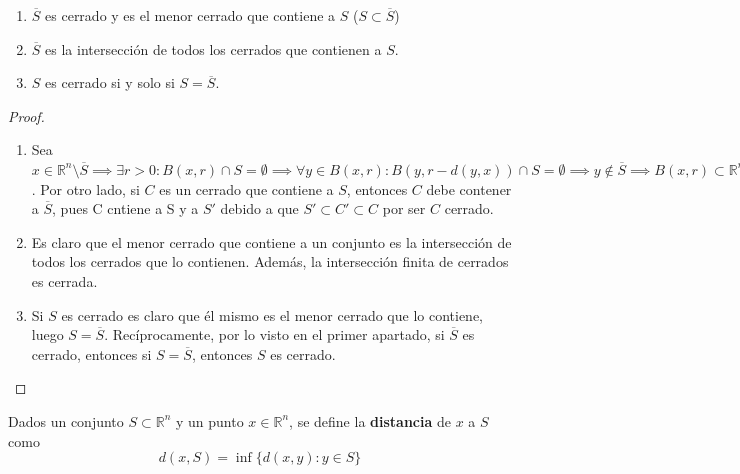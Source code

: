 \begin{proposición}
    \begin{enumerate}
        \item $\overline{S}$ es cerrado y es el menor cerrado que contiene a $S$ ($S \subset \overline{S}$)
        \item $\overline{S}$ es la intersección de todos los cerrados que contienen a $S$.
        \item $S$ es cerrado si y solo si $S = \overline{S}$.
    \end{enumerate}
\end{proposición}
\begin{proof}
    \begin{enumerate}
        \item Sea $x \in \mathbb{R}^n \setminus \overline{S} \implies \exists r > 0 : B(x, r) \cap S = \emptyset \implies \forall y \in B(x, r) : B(y, r - d(y,x)) \cap S = \emptyset \implies y \notin \overline{S} \implies B(x,r) \subset \mathbb{R}^n \setminus \overline{S}$. \newline
        Por otro lado, si $C$ es un cerrado que contiene a $S$, entonces $C$ debe contener a $\overline{S}$, pues C cntiene a S y a $S'$ debido a que $S' \subset C' \subset C$ por ser $C$ cerrado. 
        \item Es claro que el menor cerrado que contiene a un conjunto es la intersección de todos los cerrados que lo contienen. Además, la intersección finita de cerrados es cerrada. 
        \item Si $S$ es cerrado es claro que él mismo es el menor cerrado que lo contiene, luego $S = \overline{S}$. Recíprocamente, por lo visto en el primer apartado, si $\overline{S}$ es cerrado, entonces si $S = \overline{S}$, entonces $S$ es cerrado.
    \end{enumerate}
\end{proof}

\begin{definición}[Distancia]
    Dados un conjunto $S \subset \mathbb{R}^n$ y un punto $x \in \mathbb{R}^n$, se define la \textbf{distancia} de $x$ a $S$ como
    $$d(x, S) = \inf\{d(x, y) : y \in S\}$$
\end{definición}

